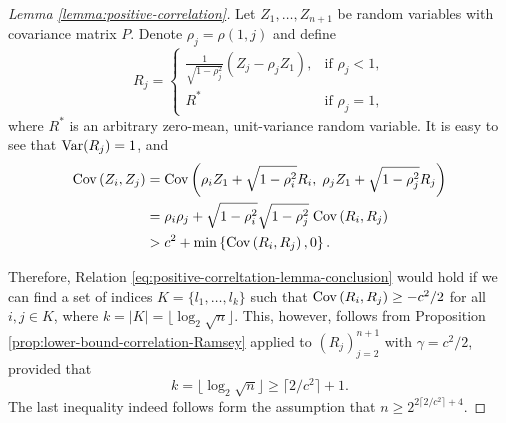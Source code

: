 \begin{proof}[Lemma \ref{lemma:positive-correlation}]
    Let $Z_1, \ldots, Z_{n+1}$ be random variables with covariance matrix $P$.
    Denote $\rho_j = \rho(1,j)$ and define 
    \begin{equation}
      R_j = 
      \begin{cases}
        \frac{1}{\sqrt{1-\rho_j^2}}\left(Z_j - \rho_j Z_1\right), &\mbox{if } \rho_j<1,\\
        R^* &\mbox{if } \rho_j=1,
      \end{cases}
    \end{equation}
    where $R^*$ is an arbitrary zero-mean, unit-variance random variable.
    It is easy to see that ${\rm {Var}}(R_j) = 1$, and
    \begin{align*}
    {\rm {Cov}}\left(Z_i, Z_j\right) &= {\rm {Cov}}\left(\rho_i Z_1 + \sqrt{1-\rho_i^2} R_i, \; \rho_j Z_1 + \sqrt{1-\rho_j^2} R_j\right) \\
        &= \rho_i\rho_j + \sqrt{1-\rho_i^2}\sqrt{1-\rho_j^2} \;{\rm {Cov}}\left(R_i, R_j\right) \\
        &> c^2 + \min\left\{{\rm {Cov}}\left(R_i, R_j\right), 0\right\}.
    \end{align*}
    
    Therefore, Relation \eqref{eq:positive-correltation-lemma-conclusion} would hold if we can find a set of indices $K = \{l_1,\ldots,l_k\}$ such that ${\rm {Cov}}\left(R_i,R_j\right)\ge -c^2/2$ for all $i,j\in K$, where $k=|K|=\lfloor\log_2\sqrt{n}\rfloor$.
    This, however, follows from Proposition \ref{prop:lower-bound-correlation-Ramsey} applied to $\left(R_j\right)_{j=2}^{n+1}$ with $\gamma = c^2/2$, provided that 
    $$
    k = \lfloor\log_2\sqrt{n}\rfloor \ge \lceil 2/c^2 \rceil + 1.
    $$
    The last inequality indeed follows form the assumption that $n \ge 2^{2\lceil2/c^2\rceil+4}$.
\end{proof}


